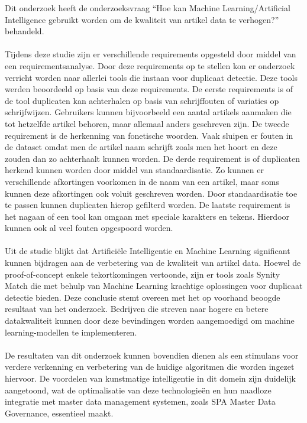 Dit onderzoek heeft de onderzoeksvraag “Hoe kan Machine Learning/Artificial Intelligence gebruikt worden om de kwaliteit van artikel data te verhogen?” behandeld. 
\\ \\Tijdens deze studie zijn er verschillende requirements opgesteld door middel van een requirementsanalyse. Door deze requirements op te stellen kon er onderzoek verricht worden naar allerlei tools die instaan voor duplicaat detectie. Deze tools werden beoordeeld op basis van deze requirements. De eerste requirements is of de tool duplicaten kan achterhalen op basis van schrijffouten of variaties op schrijfwijzen. Gebruikers kunnen bijvoorbeeld een aantal artikels aanmaken die tot hetzelfde artikel behoren, maar allemaal anders geschreven zijn. De tweede requirement is de herkenning van fonetische woorden. Vaak sluipen er fouten in de dataset omdat men de artikel naam schrijft zoals men het hoort en deze zouden dan zo achterhaalt kunnen worden. De derde requirement is of duplicaten herkend kunnen worden door middel van standaardisatie. Zo kunnen er verschillende afkortingen voorkomen in de naam van een artikel, maar soms kunnen deze afkortingen ook voluit geschreven worden. Door standaardisatie toe te passen kunnen duplicaten hierop gefilterd worden. De laatste requirement is het nagaan of een tool kan omgaan met speciale karakters en tekens. Hierdoor kunnen ook al veel fouten opgespoord worden.
\\ \\Uit de studie blijkt dat Artificiële Intelligentie en Machine Learning significant kunnen bijdragen aan de verbetering  van de kwaliteit van artikel data. Hoewel de proof-of-concept enkele tekortkomingen vertoonde, zijn er tools zoals Synity Match die met behulp van Machine Learning krachtige oplossingen voor duplicaat detectie bieden. Deze conclusie stemt overeen met het op voorhand beoogde resultaat van het onderzoek. Bedrijven die streven naar hogere en betere datakwaliteit kunnen door deze bevindingen worden aangemoedigd om machine learning-modellen te implementeren.
\\ \\De resultaten van dit onderzoek kunnen bovendien dienen als een stimulans voor verdere verkenning en verbetering van de huidige algoritmen die worden ingezet hiervoor. De voordelen van kunstmatige intelligentie in dit domein zijn duidelijk aangetoond, wat de optimalisatie van deze technologieën en hun naadloze integratie met master data management systemen, zoals SPA Master Data Governance, essentieel maakt.
